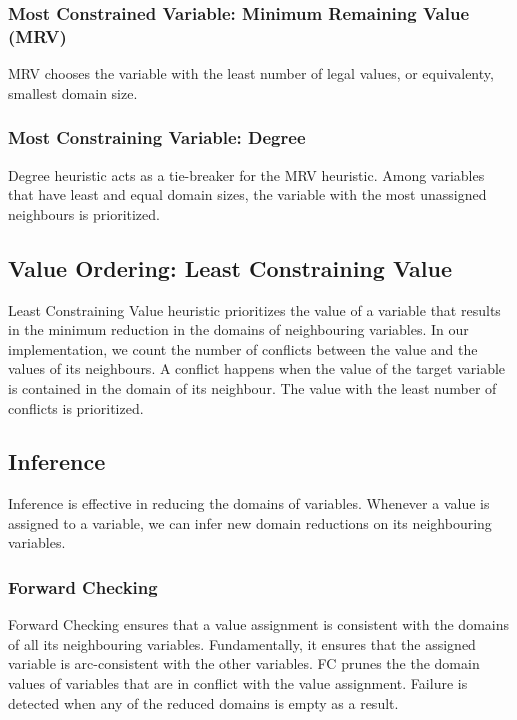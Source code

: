 \documentclass[runningheads]{llncs}
\begin{document}
\subsubsection{Most Constrained Variable: Minimum Remaining Value (MRV)} 

MRV chooses the variable with the least number of legal values, or equivalenty, smallest domain size.

\subsubsection{Most Constraining Variable: Degree}

Degree heuristic acts as a tie-breaker for the MRV heuristic. Among variables that have least and equal domain sizes, the variable with the most unassigned neighbours is prioritized.

\subsection{Value Ordering: Least Constraining Value}

Least Constraining Value heuristic prioritizes the value of a variable that results in the minimum reduction in the domains of neighbouring variables. In our implementation, we count the number of conflicts between the value and the values of its neighbours. A conflict happens when the value of the target variable is contained in the domain of its neighbour. The value with the least number of conflicts is prioritized. 

\subsection{Inference}

Inference is effective in reducing the domains of variables. Whenever a value is assigned to a variable, we can infer new domain reductions on its neighbouring variables. 

\subsubsection{Forward Checking}

Forward Checking ensures that a value assignment is consistent with the domains of all its neighbouring variables. Fundamentally, it ensures that the assigned variable is arc-consistent with the other variables. FC prunes the the domain values of variables that are in conflict with the value assignment. Failure is detected when any of the reduced domains is empty as a result.
\end{document}
